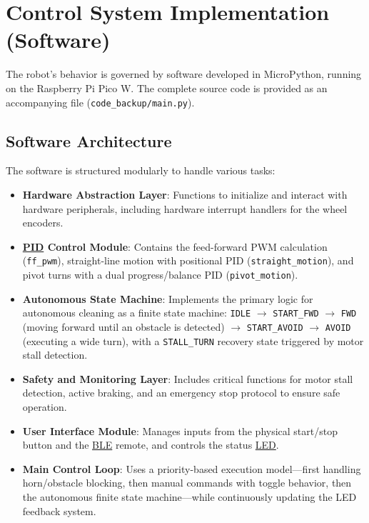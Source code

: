 \section{Control System Implementation (Software)}
\label{sec:control_implementation_software_ctrl_new} %
The robot's behavior is governed by software developed in MicroPython, running on the Raspberry Pi Pico W. The complete source code is provided as an accompanying file (\texttt{code\_backup/main.py}).
\subsection{Software Architecture}
\label{subsec:software_architecture_new}
The software is structured modularly to handle various tasks:
\begin{itemize}
    \item \textbf{Hardware Abstraction Layer}: Functions to initialize and interact with hardware peripherals, including hardware interrupt handlers for the wheel encoders.
    \item \textbf{\hyperref[term:pid]{PID} Control Module}: Contains the feed-forward PWM calculation (\texttt{ff\_pwm}), straight-line motion with positional PID (\texttt{straight\_motion}), and pivot turns with a dual progress/balance PID (\texttt{pivot\_motion}).
    \item \textbf{Autonomous State Machine}: Implements the primary logic for autonomous cleaning as a finite state machine: \texttt{IDLE} $\to$ \texttt{START\_FWD} $\to$ \texttt{FWD} (moving forward until an obstacle is detected) $\to$ \texttt{START\_AVOID} $\to$ \texttt{AVOID} (executing a wide turn), with a \texttt{STALL\_TURN} recovery state triggered by motor stall detection.
    \item \textbf{Safety and Monitoring Layer}: Includes critical functions for motor stall detection, active braking, and an emergency stop protocol to ensure safe operation.
    \item \textbf{User Interface Module}: Manages inputs from the physical start/stop button and the \hyperref[term:ble]{BLE} remote, and controls the status \hyperref[term:led]{LED}.
    \item \textbf{Main Control Loop}: Uses a priority-based execution model---first handling horn/obstacle blocking, then manual commands with toggle behavior, then the autonomous finite state machine---while continuously updating the LED feedback system.
\end{itemize}


